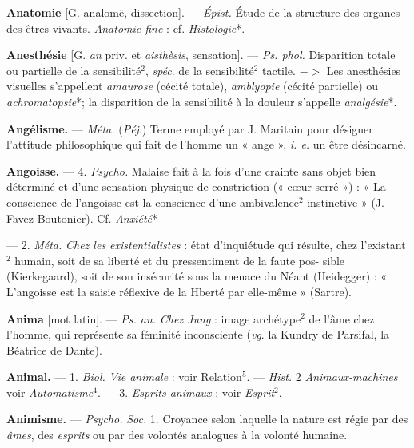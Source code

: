 \begin{itemize}[leftmargin=1cm, label=, itemsep=1pt]
{{{{\item {\bf Anatomie} [G. analomë, dissection].
— \textsf{\textit {Épist.}} Étude de la structure des
organes des êtres vivants. {\it Anatomie
fine} : cf. {\it Histologie}*.

\item {\bf Anesthésie} [G. {\it an} priv. et {\it aisthèsis},
sensation]. — \textsf{\textit {Ps. phol.}} Disparition
totale ou partielle de la sensibilité$^2$,
{\it spéc}. de la sensibilité$^2$ tactile. $->$
Les anesthésies visuelles s’appellent
{\it amaurose} (cécité totale), {\it amblyopie}
(cécité partielle) ou {\it achromatopsie}*;
la disparition de la sensibilité à la
douleur s’appelle {\it analgésie}*.

\item {\bf Angélisme.} — \textsf{\textit {Méta.}} ({\it Péj}.) Terme
employé par J. Maritain pour désigner l'attitude philosophique qui
fait de l’homme un « ange », {\it i. e.} un
être désincarné.

\item {\bf Angoisse.} — 4. \textsf{\textit {Psycho.}} Malaise fait à
la fois d’une crainte sans objet bien
déterminé et d’une sensation physique de constriction (« cœur serré ») :
« La conscience de l’angoisse est la
conscience d'une ambivalence$^2$ instinctive » (J. Favez-Boutonier). Cf.
{\it Anxiété}*

— 2. \textsf{\textit {Méta.}} {\it Chez les existentialistes} :
état d'inquiétude qui résulte, chez
l'existant$^2$ humain, soit de sa liberté
et du pressentiment de la faute pos-
sible (Kierkegaard), soit de son
insécurité sous la menace du Néant
(Heidegger) : « L'angoisse est la
saisie réflexive de la Hberté par
elle-même » (Sartre).

\item {\bf Anima} [mot latin]. — \textsf{\textit {Ps. an.}} {\it Chez
Jung} : image archétype$^2$ de l’âme
chez l’homme, qui représente sa
féminité inconsciente ({\it vg}. la Kundry
de Parsifal, la Béatrice de Dante).

\item {\bf Animal.} — 1. \textsf{\textit {Biol.}} {\it Vie animale} : voir
Relation$^5$. — \textsf{\textit {Hist.}} 2 {\it Animaux-machines} voir {\it Automatisme}$^4$. —
3. {\it Esprits animaux} : voir {\it Esprit}$^2$.

\item {\bf Animisme.} — \textsf{\textit {Psycho.}} \textsf{\textit {Soc.}} 1. Croyance
selon laquelle la nature est régie par
des {\it âmes}, des {\it esprits} ou par des
volontés analogues à la volonté
humaine.

}}}}
\end{itemize}
